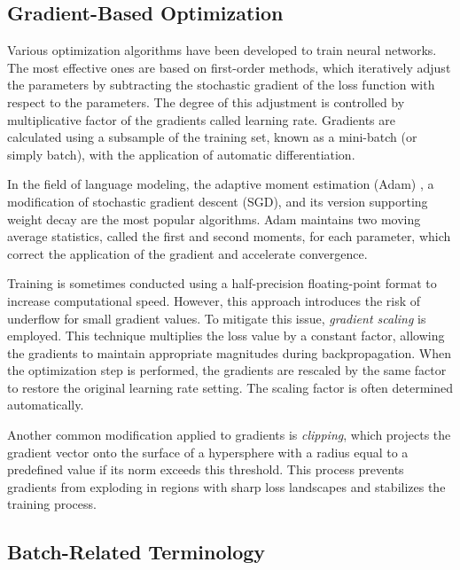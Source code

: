 \subsection{Gradient-Based Optimization}

Various optimization algorithms have been developed to train neural networks. The most effective ones are based on first-order methods, which iteratively adjust the parameters by subtracting the stochastic gradient of the loss function with respect to the parameters. The degree of this adjustment is controlled by multiplicative factor of the gradients called learning rate. Gradients are calculated using a subsample of the training set, known as a mini-batch (or simply batch), with the application of automatic differentiation.

In the field of language modeling, the adaptive moment estimation (Adam) \parencite{kingma2014}, a modification of stochastic gradient descent (SGD), and its version supporting weight decay \parencite{loshchilov2017} are the most popular algorithms. Adam maintains two moving average statistics, called the first and second moments, for each parameter, which correct the application of the gradient and accelerate convergence.

Training is sometimes conducted using a half-precision floating-point format to increase computational speed. However, this approach introduces the risk of underflow for small gradient values. To mitigate this issue, \textit{gradient scaling} is employed. This technique multiplies the loss value by a constant factor, allowing the gradients to maintain appropriate magnitudes during backpropagation. When the optimization step is performed, the gradients are rescaled by the same factor to restore the original learning rate setting. The scaling factor is often determined automatically. \parencite{nvidia2024}

\begin{sloppypar}
Another common modification applied to gradients is \textit{clipping}, which projects the gradient vector onto the surface of a hypersphere with a radius equal to a predefined value if its norm exceeds this threshold. This process prevents gradients from exploding in regions with sharp loss landscapes and stabilizes the training process. \parencite{pascanu2013}
\end{sloppypar}

\subsection{Batch-Related Terminology}

